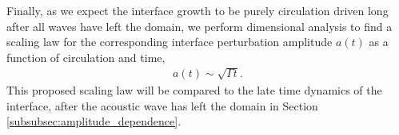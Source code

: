 Finally, as we expect the interface growth to be purely circulation driven
long after all waves have left the domain, we perform dimensional
analysis to find a scaling law for the corresponding interface
perturbation amplitude $a(t)$ as a function of circulation and time,
\begin{align} \label{eq:intf_circ_scaling}
  a(t) \sim \sqrt{\Gamma t}.
\end{align}
This proposed scaling law will be compared to the late time dynamics
of the interface, after the acoustic wave has left the domain in
Section \ref{subsubsec:amplitude_dependence}.





%



